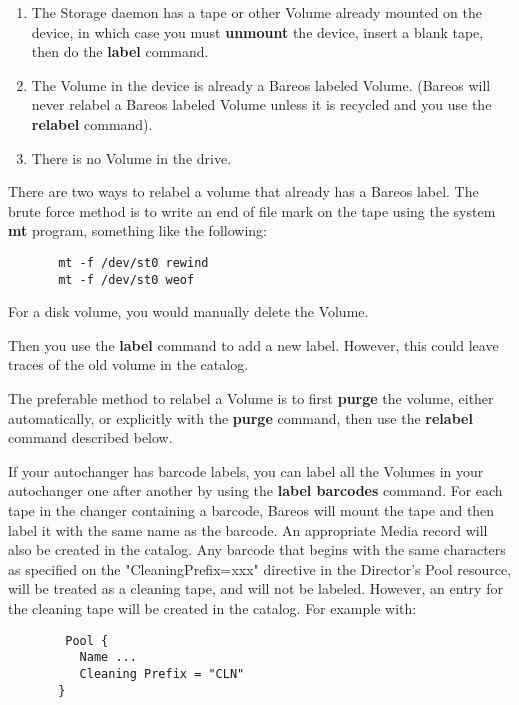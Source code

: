 \begin{description}
\begin{enumerate}
\item The Storage daemon has a tape or other Volume already mounted on the
   device, in which case you must {\bf unmount} the device, insert a blank
   tape, then do the {\bf label} command.

\item The Volume in the device is already a Bareos labeled Volume.  (Bareos will
   never relabel a Bareos labeled Volume unless it is recycled and you use the
   {\bf relabel} command).

\item There is no Volume in the drive.
\end{enumerate}

There are two ways to relabel a volume that already has a Bareos label. The
brute  force method is to write an end of file mark on the tape  using the
system {\bf mt} program, something like the  following:

\footnotesize
\begin{verbatim}
       mt -f /dev/st0 rewind
       mt -f /dev/st0 weof
\end{verbatim}
\normalsize

For a disk volume, you would manually delete the Volume.

Then you use the {\bf label} command to add a new label.  However, this could
leave traces of the old volume in the  catalog.

The preferable method to relabel a Volume is to first {\bf purge}  the volume,
either automatically, or explicitly with the  {\bf purge} command, then use
the {\bf relabel} command described  below.

If your autochanger has barcode labels, you can label all the Volumes in
your autochanger one after another by using the {\bf label barcodes}
command.  For each tape in the changer containing a barcode, Bareos will
mount the tape and then label it with the same name as the barcode.  An
appropriate Media record will also be created in the catalog.  Any barcode
that begins with the same characters as specified on the
"CleaningPrefix=xxx" directive in the Director's Pool resource, will be
treated as a cleaning tape, and will not be labeled.  However, an entry for
the cleaning tape will be created in the catalog.  For example with:

\footnotesize
\begin{verbatim}
        Pool {
          Name ...
          Cleaning Prefix = "CLN"
       }

\end{verbatim}
\normalsize


\end{description}
